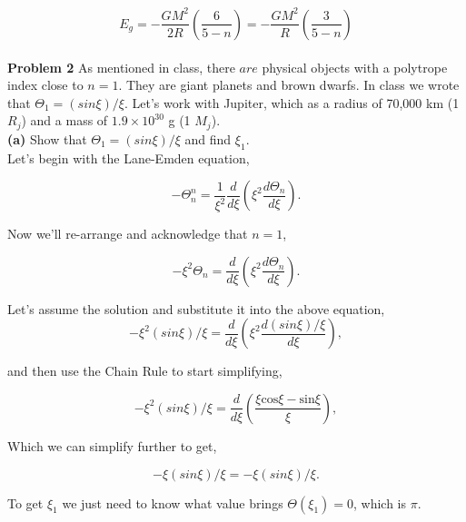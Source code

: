 \documentclass[12pt]{article}
\begin{document}
\begin{equation}
E_g = -\frac{GM^2}{2R}\left(   \frac{6}{5 -n} \right) =  -\frac{GM^2}{R}\left(   \frac{3}{5 -n} \right)
\end{equation}
\\
\noindent \textbf{Problem 2} As mentioned in class, there $are$ physical objects with a polytrope index close to $n=1$. They are giant planets and brown dwarfs. In class we wrote that $\Theta_1 = \left( sin \xi \right)/\xi$. Let's work with Jupiter, which as a radius of 70,000 km (1 $R_j$) and a mass of $1.9 \times 10^{30}$ g (1 $M_j$).\\

 
 \noindent \textbf{(a)} Show that  $\Theta_1 = \left( sin \xi \right)/\xi$ and find $\xi_1$. \\
 
 \noindent Let's begin with the Lane-Emden equation,

\begin{equation}
-\Theta_n^n = \frac{1}{\xi^2}\frac{d}{d\xi}\left ( \xi^2 \frac{d\Theta_n}{d\xi}\right).
\end{equation}

\noindent Now we'll re-arrange and acknowledge that $n=1$,

\begin{equation}
-\xi^2\Theta_n = \frac{d}{d\xi}\left ( \xi^2 \frac{d\Theta_n}{d\xi}\right).
\end{equation}

\noindent Let's assume the solution and substitute it into the above equation, 
\begin{equation}
-\xi^2 \left( sin \xi \right)/\xi = \frac{d}{d\xi}\left ( \xi^2 \frac{d\left( sin \xi \right)/\xi}{d\xi}\right),
\end{equation}

\noindent and then use the Chain Rule to start simplifying, 

\begin{equation}
-\xi^2 \left( sin \xi \right)/\xi =  \frac{d}{d\xi}\left ( \frac{\xi\mathrm{cos}\xi - \mathrm{sin}\xi}{\xi}\right),
\end{equation}

\noindent Which we can simplify further to get,

\begin{equation}
-\xi \left( sin \xi \right)/\xi = -\xi \left( sin \xi \right)/\xi.
\end{equation}

\noindent To get $\xi_1$ we just need to know what value brings $\Theta\left(\xi_1\right) = 0$, which is $\pi$.  \\
\end{document}
